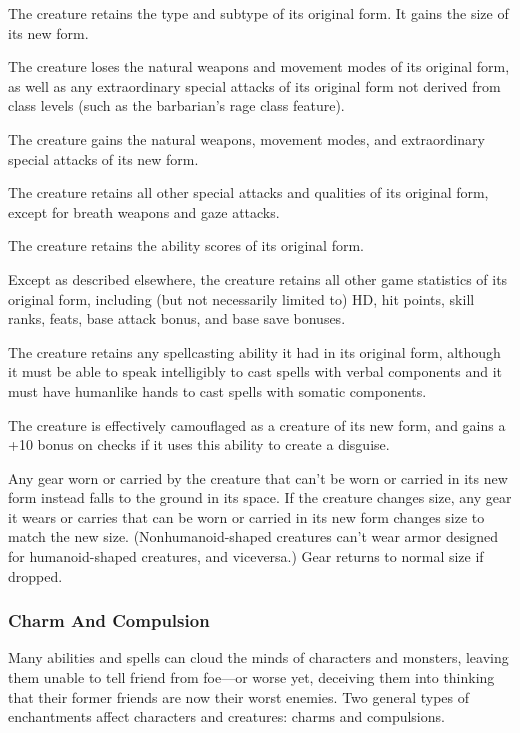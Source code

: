 \begin{itemize*}
\item The creature retains the type and subtype of its original form. It gains the size of its new form.
\item The creature loses the natural weapons and movement modes of its original form, as well as any extraordinary special attacks of its original form not derived from class levels (such as the barbarian's rage class feature).
\item The creature gains the natural weapons, movement modes, and extraordinary special attacks of its new form.
\item The creature retains all other special attacks and qualities of its original form, except for breath weapons and gaze attacks.
\item The creature retains the ability scores of its original form.
\item Except as described elsewhere, the creature retains all other game statistics of its original form, including (but not necessarily limited to) HD, hit points, skill ranks, feats, base attack bonus, and base save bonuses.
\item The creature retains any spellcasting ability it had in its original form, although it must be able to speak intelligibly to cast spells with verbal components and it must have humanlike hands to cast spells with somatic components.
\item The creature is effectively camouflaged as a creature of its new form, and gains a +10 bonus on  checks if it uses this ability to create a disguise.
\item Any gear worn or carried by the creature that can't be worn or carried in its new form instead falls to the ground in its space. If the creature changes size, any gear it wears or carries that can be worn or carried in its new form changes size to match the new size. (Nonhumanoid-shaped creatures can't wear armor designed for humanoid-shaped creatures, and viceversa.) Gear returns to normal size if dropped.
\end{itemize*}

\subsubsection{Charm And Compulsion}
Many abilities and spells can cloud the minds of characters and monsters, leaving them unable to tell friend from foe---or worse yet, deceiving them into thinking that their former friends are now their worst enemies. Two general types of enchantments affect characters and creatures: charms and compulsions.

